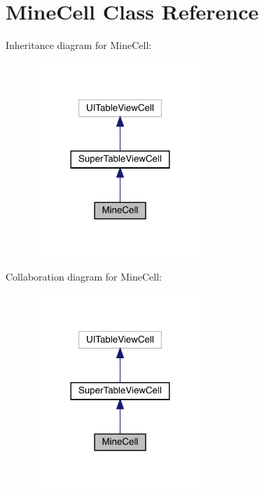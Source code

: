 \hypertarget{interface_mine_cell}{}\section{Mine\+Cell Class Reference}
\label{interface_mine_cell}


Inheritance diagram for Mine\+Cell\+:\nopagebreak
\begin{figure}[H]
\begin{center}
\leavevmode
\includegraphics[width=185pt]{interface_mine_cell__inherit__graph}
\end{center}
\end{figure}


Collaboration diagram for Mine\+Cell\+:\nopagebreak
\begin{figure}[H]
\begin{center}
\leavevmode
\includegraphics[width=185pt]{interface_mine_cell__coll__graph}
\end{center}
\end{figure}
